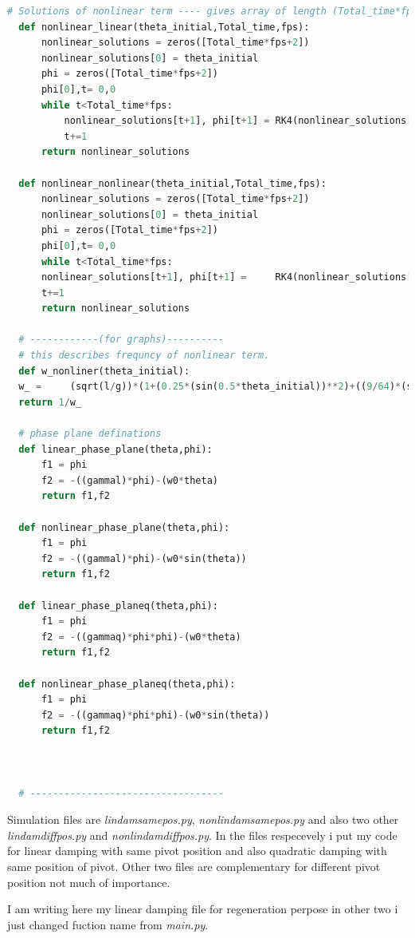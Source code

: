 \documentclass[11pt,a4paper]{article}
\begin{document}
\begin{lstlisting}[language=Python]
  # Solutions of nonlinear term ---- gives array of length (Total_time*fps)
  def nonlinear_linear(theta_initial,Total_time,fps):
      nonlinear_solutions = zeros([Total_time*fps+2])
      nonlinear_solutions[0] = theta_initial
      phi = zeros([Total_time*fps+2])
      phi[0],t= 0,0
      while t<Total_time*fps:
          nonlinear_solutions[t+1], phi[t+1] = RK4(nonlinear_solutions[t],phi[t],1/fps,f2nonlinear_linear)
          t+=1
      return nonlinear_solutions

  def nonlinear_nonlinear(theta_initial,Total_time,fps):
      nonlinear_solutions = zeros([Total_time*fps+2])
      nonlinear_solutions[0] = theta_initial
      phi = zeros([Total_time*fps+2])
      phi[0],t= 0,0
      while t<Total_time*fps:
      nonlinear_solutions[t+1], phi[t+1] =     RK4(nonlinear_solutions[t],phi[t],1/fps,f2nonlinear_nonlinear)
      t+=1
      return nonlinear_solutions

  # ------------(for graphs)----------
  # this describes frequncy of nonlinear term.
  def w_nonliner(theta_initial):
  w_ =     (sqrt(l/g))*(1+(0.25*(sin(0.5*theta_initial))**2)+((9/64)*(sin(theta_initial*0.5))**4))
  return 1/w_

  # phase plane definations
  def linear_phase_plane(theta,phi):
      f1 = phi
      f2 = -((gammal)*phi)-(w0*theta)
      return f1,f2

  def nonlinear_phase_plane(theta,phi):
      f1 = phi
      f2 = -((gammal)*phi)-(w0*sin(theta))
      return f1,f2

  def linear_phase_planeq(theta,phi):
      f1 = phi
      f2 = -((gammaq)*phi*phi)-(w0*theta)
      return f1,f2

  def nonlinear_phase_planeq(theta,phi):
      f1 = phi
      f2 = -((gammaq)*phi*phi)-(w0*sin(theta))
      return f1,f2



  # ----------------------------------

\end{lstlisting}

Simulation files are \emph{lindamsamepos.py}, \emph{nonlindamsamepos.py} and also two other \emph{lindamdiffpos.py} and \emph{nonlindamdiffpos.py}. In the files respecevely i put my code for linear damping with same pivot position and also quadratic damping with same position of pivot. Other two files are complementary for different pivot position not much of importance.

I am writing here my linear damping file for regeneration perpose in other two i just changed fuction name from \emph{main.py}.
\end{document}
